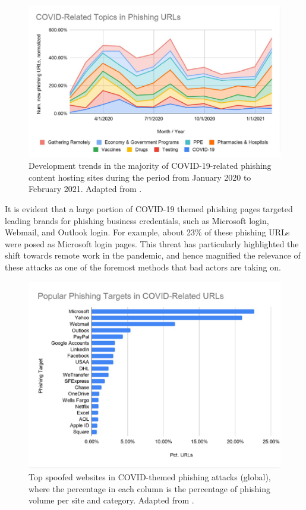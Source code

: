 \captionsetup{font= footnotesize}
\begin{figure}[H]
    \centering
    \includegraphics[width=0.8\linewidth]{background/CovidPhising.png}
    \caption{Development trends in the majority of COVID-19-related phishing content hosting sites during the period from January 2020 to February 2021. Adapted from \cite{Unit42AtricleCovidPhishing2021}.}
    \label{fig:figFourteen}
\end{figure}

It is evident that a large portion of COVID-19 themed phishing pages targeted leading brands for phishing business credentials, such as Microsoft login, Webmail, and Outlook login. For example, about 23\% of these phishing URLs were posed as Microsoft login pages. This threat has particularly highlighted the shift towards remote work in the pandemic, and hence magnified the relevance of these attacks as one of the foremost methods that bad actors are taking on.


\captionsetup{font= footnotesize}
\begin{figure}[H]
    \centering
    \includegraphics[width=0.8\linewidth]{background/TOPCOVIDURLS.png}
    \caption{Top spoofed websites in COVID-themed phishing attacks (global), where the percentage in each column is the percentage of phishing volume per site and category. Adapted from \cite{Unit42AtricleCovidPhishing2021}.}
    \label{fig:figFiveteen}
\end{figure}

